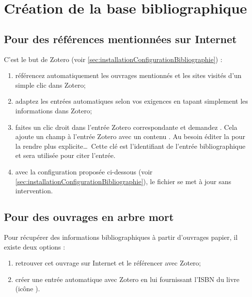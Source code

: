 \section{Création de la base bibliographique}


\subsection{Pour des références mentionnées sur Internet}
\label{sec:referenceSurInternet}

C'est le but de Zotero (voir \ref{sec:installationConfigurationBibliographie}) :
\begin{enumerate}
	\item référencez automatiquement les ouvrages mentionnés et les sites visités d'un simple clic dans Zotero;
	\item adaptez les entrées automatiques selon vos exigences en tapant simplement les informations dans Zotero;
	\item faites un clic droit dans l'entrée Zotero correspondante et demandez . Cela ajoute un champ  à l'entrée Zotero avec un contenu . Au besoin éditer la  pour la rendre plus explicite\dots \ Cette clé est l'identifiant de l'entrée bibliographique et sera utilisée pour citer l'entrée.
	\item avec la configuration proposée ci-dessous (voir \ref{sec:installationConfigurationBibliographie}), le fichier  se met à jour sans intervention.	
\end{enumerate}



\subsection{Pour des ouvrages en arbre mort}

Pour récupérer des informations bibliographiques à partir d'ouvrages papier, il existe deux options :
\begin{enumerate}
	\item retrouver cet ouvrage sur Internet et le référencer avec Zotero;
	\item créer une entrée automatique avec Zotero en lui fournissant l'ISBN du livre (icône ).
\end{enumerate}





